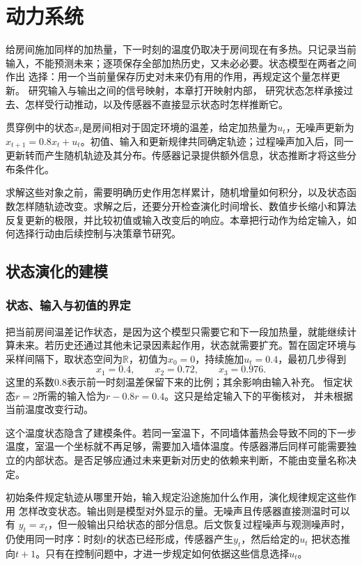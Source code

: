 \chapter{动力系统}
\label{chap:dynamical-systems-and-state-estimation}
\label{chap:action-and-state}

给房间施加同样的加热量，下一时刻的温度仍取决于房间现在有多热。只记录当前
输入，不能预测未来；逐项保存全部加热历史，又未必必要。状态模型在两者之间作出
选择：用一个当前量保存历史对未来仍有用的作用，再规定这个量怎样更新。
研究输入与输出之间的信号映射，本章打开映射内部，
研究状态怎样承接过去、怎样受行动推动，以及传感器不直接显示状态时怎样推断它。

贯穿例中的状态\(x_t\)是房间相对于固定环境的温差，给定加热量为\(u_t\)，无噪声更新为\(x_{t+1}=0.8x_t+u_t\)。初值、输入和更新规律共同确定轨迹；过程噪声加入后，同一更新转而产生随机轨迹及其分布。传感器记录提供额外信息，状态推断才将这些分布条件化。

求解这些对象之前，需要明确历史作用怎样累计，随机增量如何积分，以及状态函数怎样随轨迹改变。求解之后，还要分开检查演化时间增长、数值步长缩小和算法反复更新的极限，并比较初值或输入改变后的响应。本章把行动作为给定输入，如何选择行动由后续控制与决策章节研究。

\section{状态演化的建模}
\label{sec:dynamical-difference-ode}

\subsection{状态、输入与初值的界定}
把当前房间温差记作状态，是因为这个模型只需要它和下一段加热量，就能继续计算未来。若历史还通过其他未记录因素起作用，状态就需要扩充。暂在固定环境与采样间隔下，取状态空间为$\mathbb R$，初值为$x_0=0$，持续施加$u_t=0.4$，最初几步得到
\[
  x_1=0.4,\qquad x_2=0.72,\qquad x_3=0.976.
\]
这里的系数$0.8$表示前一时刻温差保留下来的比例；其余影响由输入补充。
恒定状态$r=2$所需的输入恰为$r-0.8r=0.4$。这只是给定输入下的平衡核对，
并未根据当前温度改变行动。

这个温度状态隐含了建模条件。若同一室温下，不同墙体蓄热会导致不同的下一步温度，室温一个坐标就不再足够，需要加入墙体温度。传感器滞后同样可能需要独立的内部状态。是否足够应通过未来更新对历史的依赖来判断，不能由变量名称决定。

初始条件规定轨迹从哪里开始，输入规定沿途施加什么作用，演化规律规定这些作用
怎样改变状态。输出则是模型对外显示的量。无噪声且传感器直接测温时可以有
$y_t=x_t$，但一般输出只给状态的部分信息。后文恢复过程噪声与观测噪声时，
仍使用同一时序：时刻$t$的状态已经形成，传感器产生$y_t$，然后给定的$u_t$
把状态推向$t+1$。只有在控制问题中，才进一步规定如何依据这些信息选择$u_t$。

